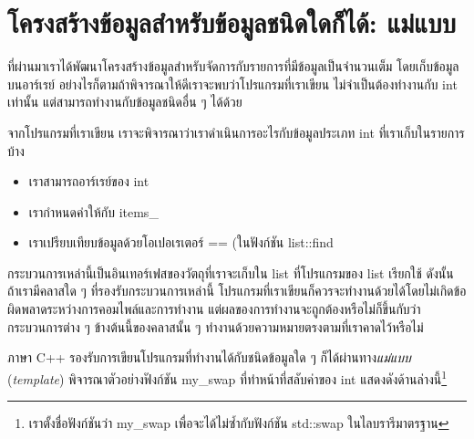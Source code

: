 \section{โครงสร้าง{\wbr}ข้อมูล{\wbr}สำหรับ{\wbr}ข้อมูล{\wbr}ชนิด{\wbr}ใด{\wbr}ก็ได้: แม่แบบ}
ที่{\wbr}ผ่าน{\wbr}มา{\wbr}เรา{\wbr}ได้{\wbr}พัฒนา{\wbr}โครงสร้าง{\wbr}ข้อมูล{\wbr}สำหรับ{\wbr}จัดการ{\wbr}กับ{\wbr}รายการ{\wbr}ที่{\wbr}มี{\wbr}ข้อมูล{\wbr}เป็น{\wbr}จำนวนเต็ม{\wbr}
โดย{\wbr}เก็บ{\wbr}ข้อมูล{\wbr}บน{\wbr}อาร์เรย์ อย่างไรก็ตาม{\wbr}ถ้า{\wbr}พิจารณา{\wbr}ให้{\wbr}ดี{\wbr}เรา{\wbr}จะ{\wbr}พบ{\wbr}ว่า{\wbr}โปรแกรม{\wbr}ที่{\wbr}เรา{\wbr}เขียน{\wbr}
ไม่{\wbr}จำเป็น{\wbr}ต้อง{\wbr}ทำงาน{\wbr}กับ {\ct int} เท่านั้น แต่{\wbr}สามารถ{\wbr}ทำงาน{\wbr}กับ{\wbr}ข้อมูล{\wbr}ชนิด{\wbr}อื่น ๆ ได้{\wbr}ด้วย{\wbr}

จาก{\wbr}โปรแกรม{\wbr}ที่{\wbr}เรา{\wbr}เขียน เรา{\wbr}จะ{\wbr}พิจารณา{\wbr}ว่า{\wbr}เรา{\wbr}ดำเนินการ{\wbr}อะไร{\wbr}กับ{\wbr}ข้อมูล{\wbr}ประเภท {\ct int}
ที่{\wbr}เรา{\wbr}เก็บ{\wbr}ใน{\wbr}รายการ{\wbr}บ้าง{\wbr}
\begin{itemize}
\item เรา{\wbr}สามารถ{\wbr}อาร์เรย์{\wbr}ของ {\ct int}
\item เรา{\wbr}กำหนด{\wbr}ค่า{\wbr}ให้{\wbr}กับ {\ct items\_}
\item เรา{\wbr}เปรียบเทียบ{\wbr}ข้อมูล{\wbr}ด้วย{\wbr}โอ{\wbr}เปอเรเตอร์ {\ct ==} (ใน{\wbr}ฟังก์ชัน {\ct list::find}
\end{itemize}
กระบวนการ{\wbr}เหล่านี้{\wbr}เป็น{\wbr}อิน{\wbr}เทอร์เฟส{\wbr}ของ{\wbr}วัตถุ{\wbr}ที่{\wbr}เรา{\wbr}จะ{\wbr}เก็บ{\wbr}ใน {\ct list} ที่{\wbr}โปรแกรม{\wbr}ของ{\wbr}
{\ct list} เรียก{\wbr}ใช้ ดังนั้น ถ้า{\wbr}เรา{\wbr}มี{\wbr}ค{\wbr}ลา{\wbr}ส{\wbr}ใด ๆ ที่{\wbr}รองรับ{\wbr}กระบวนการ{\wbr}เหล่านี้{\wbr}
โปรแกรม{\wbr}ที่{\wbr}เรา{\wbr}เขียน{\wbr}ก็{\wbr}ควร{\wbr}จะ{\wbr}ทำงาน{\wbr}ด้วย{\wbr}ได้{\wbr}โดย{\wbr}ไม่{\wbr}เกิด{\wbr}ข้อผิดพลาด{\wbr}ระหว่าง{\wbr}การ{\wbr}คอมไพล์{\wbr}และ{\wbr}การ{\wbr}ทำงาน{\wbr}
แต่{\wbr}ผล{\wbr}ของ{\wbr}การ{\wbr}ทำงาน{\wbr}จะ{\wbr}ถูกต้อง{\wbr}หรือ{\wbr}ไม่{\wbr}ก็{\wbr}ขึ้น{\wbr}กับ{\wbr}ว่า{\wbr}กระบวนการ{\wbr}ต่าง ๆ ข้างต้น{\wbr}นี้{\wbr}ของ{\wbr}ค{\wbr}ลา{\wbr}ส{\wbr}นั้น ๆ
ทำงาน{\wbr}ด้วย{\wbr}ความหมาย{\wbr}ตรง{\wbr}ตาม{\wbr}ที่{\wbr}เรา{\wbr}คาด{\wbr}ไว้{\wbr}หรือ{\wbr}ไม่{\wbr}

ภาษา C++ รองรับ{\wbr}การ{\wbr}เขียน{\wbr}โปรแกรม{\wbr}ที่ทำงาน{\wbr}ได้{\wbr}กับ{\wbr}ชนิด{\wbr}ข้อมูล{\wbr}ใด ๆ ก็ได้{\wbr}ผ่าน{\wbr}ทาง{\em แม่แบบ}
({\em template}) พิจารณา{\wbr}ตัวอย่าง{\wbr}ฟังก์ชัน {\ct my\_swap} ที่{\wbr}ทำ{\wbr}หน้าที่{\wbr}สลับ{\wbr}ค่า{\wbr}ของ {\ct
  int} แสดง{\wbr}ดัง{\wbr}ด้าน{\wbr}ล่าง{\wbr}นี้\footnote{เรา{\wbr}ตั้ง{\wbr}ชื่อ{\wbr}ฟังก์ชัน{\wbr}ว่า {\ct my\_swap}
  เพื่อ{\wbr}จะ{\wbr}ได้{\wbr}ไม่{\wbr}ซ้ำ{\wbr}กับ{\wbr}ฟังก์ชัน {\ct std::swap} ใน{\wbr}ไลบ{\wbr}รา{\wbr}รี{\wbr}มาตรฐาน}

